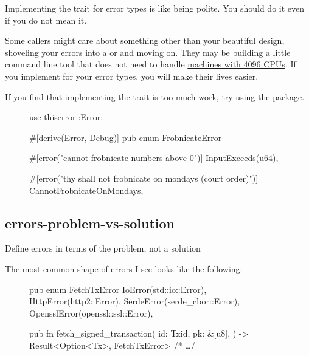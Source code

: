 \documentclass{article}
\begin{document}
Implementing the \href{https://doc.rust-lang.org/std/error/trait.Error.html}{} trait for error types is like being polite.
You should do it even if you do not mean it.

Some callers might care about something other than your beautiful design, shoveling your errors into a  or  and moving on.
They may be building a little command line tool that does not need to handle \href{https://xkcd.com/619/}{machines with 4096 CPUs}.
If you implement  for your error types, you will make their lives easier.

If you find that implementing the  trait is too much work, try using the \href{https://crates.io/crates/thiserror}{} package.

\begin{figure}
\begin{code}[good]
use thiserror::Error;

#[derive(Error, Debug)]
pub enum FrobnicateError {
  #[error("cannot frobnicate numbers above {0}")]
  InputExceeds(u64),

  #[error("thy shall not frobnicate on mondays (court order)")]
  CannotFrobnicateOnMondays,
}
\end{code}
\end{figure}

\subsection{errors-problem-vs-solution}{Define errors in terms of the problem, not a solution}

The most common shape of errors I see looks like the following:

\begin{figure}
\begin{code}[bad]
pub enum FetchTxError {
  IoError(std::io::Error),
  HttpError(http2::Error),
  SerdeError(serde_cbor::Error),
  OpensslError(openssl::ssl::Error),
}

pub fn fetch_signed_transaction(
  id: Txid,
  pk: &[u8],
) -> Result<Option<Tx>, FetchTxError> { /* \ldots  */ }
\end{code}
\end{figure}
\end{document}
